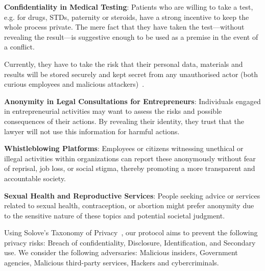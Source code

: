 \documentclass[pdftex,twocolumn,epjc3]{svjour3}
\begin{document}
\begin{itemize}
    \item \textbf{Confidentiality in Medical Testing}: Patients who are willing to take a test, e.g. for drugs, STDs, paternity or steroids, have a strong incentive to keep the whole process private. The mere fact that they have taken the test—without revealing the result—is suggestive enough to be used as a premise in the event of a conflict.

    Currently, they have to take the risk that their personal data, materials and results will be stored securely and kept secret from any unauthorised actor (both curious employees and malicious attackers)~\cite{klitzmanExclusionGeneticInformation2010, blackPresymptomaticTestingConfidentiality2021}.

\begin{sloppypar}
\item \textbf{Anonymity in Legal Consultations for Entrepreneurs}: Individuals engaged in entrepreneurial activities may want to assess the risks and possible consequences of their actions. By revealing their identity, they trust that the lawyer will not use this information for harmful actions.
\end{sloppypar}

\begin{sloppypar}
\item \textbf{Whistleblowing Platforms}: Employees or citizens witnessing unethical or illegal activities within organizations can report these anonymously without fear of reprisal, job loss, or social stigma, thereby promoting a more transparent and accountable society.
\end{sloppypar}

\begin{sloppypar}
\item \textbf{Sexual Health and Reproductive Services}: People seeking advice or services related to sexual health, contraception, or abortion might prefer anonymity due to the sensitive nature of these topics and potential societal judgment.
\end{sloppypar}

\end{itemize}

Using Solove's Taxonomy of Privacy~\cite{soloveTaxonomyPrivacy2006}, our protocol aims to prevent the following privacy risks: Breach of confidentiality, Disclosure, Identification, and Secondary use. We consider the following adversaries: Malicious insiders, Government agencies, Malicious third-party services, Hackers and cybercriminals.
\end{document}
